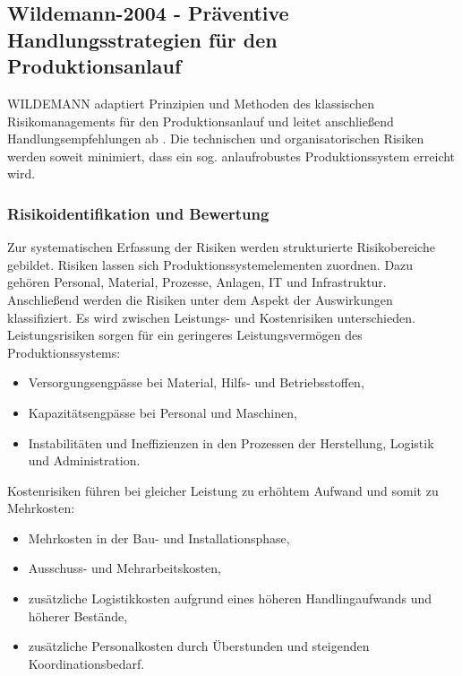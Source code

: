 \subsection*{Wildemann-2004 - Präventive Handlungsstrategien für den Produktionsanlauf}

WILDEMANN adaptiert Prinzipien und Methoden des klassischen Risikomanagements für den Produktionsanlauf und leitet anschließend Handlungsempfehlungen ab \cite{Wildemann2004}. Die technischen und organisatorischen Risiken werden soweit minimiert, dass ein sog. anlaufrobustes Produktionssystem erreicht wird. 


\subsubsection*{Risikoidentifikation und Bewertung}
Zur systematischen Erfassung der Risiken werden strukturierte Risikobereiche gebildet. 
Risiken lassen sich Produktionssystemelementen zuordnen. Dazu gehören Personal, Material, Prozesse, Anlagen, IT und Infrastruktur. Anschließend werden die Risiken unter dem Aspekt der Auswirkungen klassifiziert. Es wird zwischen Leistungs- und Kostenrisiken unterschieden. Leistungsrisiken sorgen für ein geringeres Leistungsvermögen des Produktionssystems:
\begin{itemize}
 \item Versorgungsengpässe bei Material,
Hilfs- und Betriebsstoffen,
\item Kapazitätsengpässe bei Personal und
Maschinen,
\item Instabilitäten und Ineffizienzen in
den Prozessen der Herstellung,
Logistik und Administration.
\end{itemize}
Kostenrisiken führen bei gleicher Leistung zu erhöhtem Aufwand und somit zu Mehrkosten: %
\begin{itemize}
 \item Mehrkosten in der Bau- und Installationsphase,
\item Ausschuss- und Mehrarbeitskosten,
\item zusätzliche Logistikkosten aufgrund
eines höheren Handlingaufwands
und höherer Bestände,
\item zusätzliche Personalkosten durch
Überstunden und steigenden Koordinationsbedarf.
\end{itemize}

